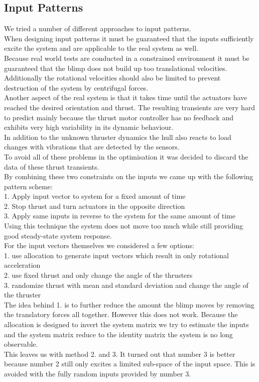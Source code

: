 \subsection{Input Patterns}
\label{sub:input_pattern}
We tried a number of different approaches to input patterns. \\
When designing input patterns it must be guaranteed that the inputs sufficiently excite the system and are applicable to the real system as well.\\
Because real world tests are conducted in a constrained environment it must be guaranteed that the blimp does not build up too translational velocities.
Additionally the rotational velocities should also be limited to prevent destruction of the system by centrifugal forces. \\
Another aspect of the real system is that it takes time until the actuators have reached the desired orientation and thrust.
The resulting transients are very hard to predict mainly because the thrust motor controller has no feedback and exhibits very high variability in its dynamic behaviour. \\
In addition to the unknown thruster dynamics the hull also reacts to load changes with vibrations that are detected by the sensors. \\
To avoid all of these problems in the optimisation it was decided to discard the data of these thrust transients. \\
By combining these two constraints on the inputs we came up with the following pattern scheme: \\
1. Apply input vector to system for a fixed amount of time\\
2. Stop thrust and turn actuators in the opposite direction\\
3. Apply same inputs in reverse to the system for the same amount of time\\
Using this technique the system does not move too much while still providing good steady-state system response. \\
For the input vectors themselves we considered a few options:\\
1. use allocation to generate input vectors which result in only rotational acceleration\\
2. use fixed thrust and only change the angle of the thrusters\\
3. randomize thrust with mean and standard deviation and change the angle of the thruster\\
The idea behind 1. is to further reduce the amount the blimp moves by removing the translatory forces all together. 
However this does not work. Because the allocation is designed to invert the system matrix we try to estimate the inputs and the system matrix reduce to the identity matrix the system is no long observable.\\
This leaves us with method 2. and 3.
It turned out that number 3 is better because number 2 still only excites a limited sub-space of the input space. This is avoided with the fully random inputs provided by number 3.\\

